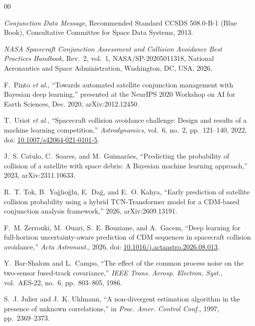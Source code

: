 \documentclass[conference]{IEEEtran}
\begin{document}
\balance
\begin{thebibliography}{00}

\emph{Conjunction Data Message}, Recommended Standard CCSDS 508.0-B-1 (Blue Book), Consultative Committee for Space Data Systems, 2013.

\emph{NASA Spacecraft Conjunction Assessment and Collision Avoidance Best Practices Handbook}, Rev.~2, vol.~1, NASA/SP-20205011318, National Aeronautics and Space Administration, Washington, DC, USA, 2026.

F.~Pinto \emph{et al.}, ``Towards automated satellite conjunction management with Bayesian deep learning,'' presented at the NeurIPS 2020 Workshop on AI for Earth Sciences, Dec. 2020, arXiv:2012.12450.

T.~Uriot \emph{et al.}, ``Spacecraft collision avoidance challenge: Design and results of a machine learning competition,'' \emph{Astrodynamics}, vol.~6, no.~2, pp.~121--140, 2022, doi: \url{10.1007/s42064-021-0101-5}.

J.~S. Catulo, C.~Soares, and M.~Guimar\~aes, ``Predicting the probability of collision of a satellite with space debris: A Bayesian machine learning approach,'' 2023, arXiv:2311.10633.

R.~T. Tok, B.~Ya\u{g}l\i{}o\u{g}lu, E.~Da\u{g}, and E.~O. Kahya, ``Early prediction of satellite collision probability using a hybrid TCN-Transformer model for a CDM-based conjunction analysis framework,'' 2026, arXiv:2609.13191.

F.~M. Zerrouki, M.~Ouari, S.~E. Bouziane, and A.~Gacem, ``Deep learning for full-horizon uncertainty-aware prediction of CDM sequences in spacecraft collision avoidance,'' \emph{Acta Astronaut.}, 2026, doi: \url{10.1016/j.actaastro.2026.08.013}.

Y.~Bar-Shalom and L.~Campo, ``The effect of the common process noise on the two-sensor fused-track covariance,'' \emph{IEEE Trans. Aerosp. Electron. Syst.}, vol.~AES-22, no.~6, pp.~803--805, 1986.

S.~J. Julier and J.~K. Uhlmann, ``A non-divergent estimation algorithm in the presence of unknown correlations,'' in \emph{Proc. Amer. Control Conf.}, 1997, pp.~2369--2373.


\end{thebibliography}
\end{document}
